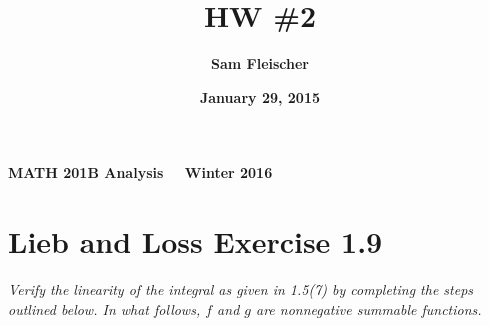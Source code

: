 \documentclass[12pt]{article}
\title{\bf HW \#2}
\author{\bf Sam Fleischer}
\date{\bf January 29, 2015}
\theoremstyle{plain}
\newenvironment{definition}[1][Definition]{\begin{trivlist}
\item[\hskip \labelsep {\bfseries #1}]}{\end{trivlist}}
\begin{document}
\textbf{MATH 201B \hfill Analysis \ \ \hfill Winter 2016\ \ \ }

{\let\newpage\relax\maketitle}

\section*{Lieb and Loss Exercise 1.9}
\emph{Verify the linearity of the integral as given in 1.5(7) by completing the steps outlined below.  In what follows, $f$ and $g$ are nonnegative summable functions.}

\end{document}
